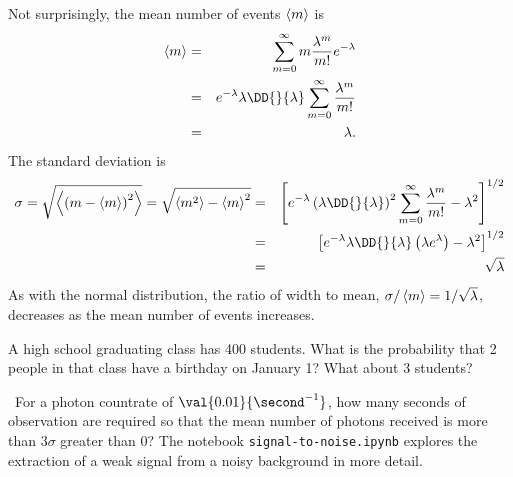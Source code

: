 Not surprisingly, the mean number of events $\left\langle m\right\rangle$ is
\begin{eqnarray*}
	\mean{m} &=& \sum_{m=0}^{\infty} m \frac{\lambda^{m}}{m!}e^{-\lambda}\\
		&=& e^{-\lambda} \lambda \DD{}{\lambda}\sum_{m=0}^{\infty} \frac{\lambda^{m}}{m!}\\
		&=& \lambda.
\end{eqnarray*}
The standard deviation is
\begin{eqnarray*}
	\sigma = \sqrt{\mean{\left(m-\mean{m}\right)^{2}}} = \sqrt{\mean{m^{2}}-\mean{m}^{2}}
		&=& \left[e^{-\lambda}\left(\lambda\DD{}{\lambda}\right)^{2}\sum_{m=0}^{\infty}\frac{\lambda^{m}}{m!}-\lambda^{2}\right]^{1/2}\\
		&=& \left[e^{-\lambda}\lambda\DD{}{\lambda}\left(\lambda e^{\lambda}\right)-\lambda^{2}\right]^{1/2}\\
		&=& \sqrt{\lambda}
\end{eqnarray*}
As with the normal distribution, the ratio of width to mean, $\sigma/\left\langle m\right\rangle = 1/\sqrt{\lambda}$, decreases as the mean number of events increases.  

\begin{exercisebox}
A high school graduating class has 400 students.  What is the probability that 2 people in that class have a birthday on January 1?  What about 3 students?
\end{exercisebox}

\begin{exercisebox}
\notebook\ For a photon countrate of $\val{0.01}{\second^{-1}}$, how many seconds of observation are required so that the mean number of photons received is more than $3\sigma$ greater than $0$? The notebook \texttt{signal-to-noise.ipynb} explores the extraction of a weak signal from a noisy background in more detail.
\end{exercisebox}

